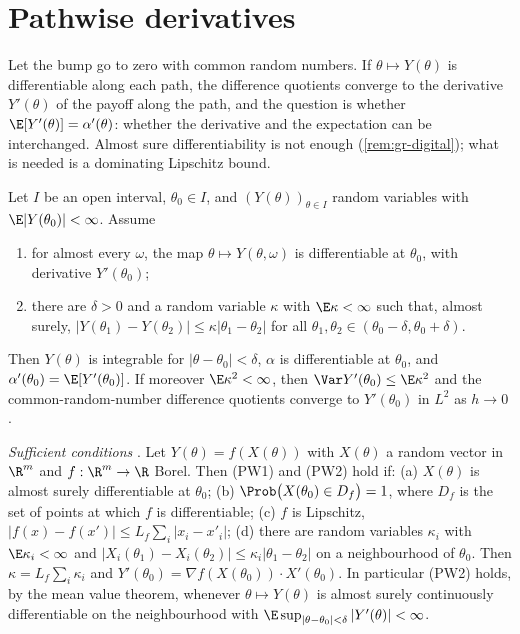 
\section{Pathwise derivatives}\label{sec:gr-pathwise}

Let the bump go to zero with common random numbers. If $\theta\mapsto Y(\theta)$ is
differentiable along each path, the difference quotients converge to the derivative
$Y'(\theta)$ of the payoff along the path, and the question is whether
$\E[Y'(\theta)]=\alpha'(\theta)$: whether the derivative and the expectation can be
interchanged. Almost sure differentiability is not enough (\cref{rem:gr-digital}); what is
needed is a dominating Lipschitz bound.

\begin{theorem}\label{thm:gr-pathwise}
Let $I$ be an open interval, $\theta_0\in I$, and $(Y(\theta))_{\theta\in I}$ random variables
with $\E|Y(\theta_0)|<\infty$. Assume
\begin{enumerate}[label=(PW\arabic*)]
  \item for almost every $\omega$, the map $\theta\mapsto Y(\theta,\omega)$ is differentiable
    at $\theta_0$, with derivative $Y'(\theta_0)$;
  \item there are $\delta>0$ and a random variable $\kappa$ with $\E\kappa<\infty$ such that,
    almost surely, $|Y(\theta_1)-Y(\theta_2)|\le\kappa|\theta_1-\theta_2|$ for all
    $\theta_1,\theta_2\in(\theta_0-\delta,\theta_0+\delta)$.
\end{enumerate}
Then $Y(\theta)$ is integrable for $|\theta-\theta_0|<\delta$, $\alpha$ is differentiable at
$\theta_0$, and $\alpha'(\theta_0)=\E[Y'(\theta_0)]$. If moreover $\E\kappa^2<\infty$, then
$\Var Y'(\theta_0)\le\E\kappa^2$ and the common-random-number difference quotients converge to
$Y'(\theta_0)$ in $L^2$ as $h\to0$.

\noindent\emph{Sufficient conditions} \citep[Section~7.2.2, conditions (A1)--(A4)]{glasserman-mc}.
Let $Y(\theta)=f(X(\theta))$ with $X(\theta)$ a random vector in $\R^m$ and $f:\R^m\to\R$
Borel. Then (PW1) and (PW2) hold if: (a) $X(\theta)$ is almost surely differentiable at
$\theta_0$; (b) $\Prob\big(X(\theta_0)\in D_f\big)=1$, where $D_f$ is the set of points at which
$f$ is differentiable; (c) $f$ is Lipschitz, $|f(x)-f(x')|\le L_f\sum_i|x_i-x'_i|$; (d) there
are random variables $\kappa_i$ with $\E\kappa_i<\infty$ and
$|X_i(\theta_1)-X_i(\theta_2)|\le\kappa_i|\theta_1-\theta_2|$ on a neighbourhood of $\theta_0$.
Then $\kappa=L_f\sum_i\kappa_i$ and $Y'(\theta_0)=\nabla f(X(\theta_0))\cdot X'(\theta_0)$. In
particular (PW2) holds, by the mean value theorem, whenever $\theta\mapsto Y(\theta)$ is almost
surely continuously differentiable on the neighbourhood with
$\E\sup_{|\theta-\theta_0|<\delta}|Y'(\theta)|<\infty$.
\end{theorem}

